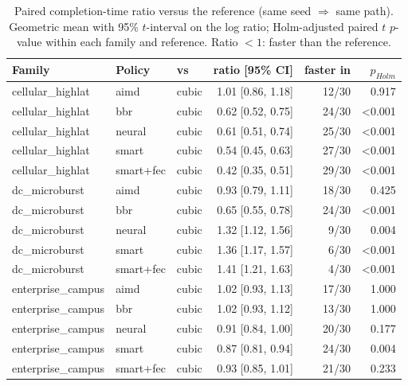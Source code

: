 \begin{table}[t]\centering\footnotesize
\caption{Paired completion-time ratio versus the reference (same seed $\Rightarrow$ same path). Geometric mean with 95\% $t$-interval on the log ratio; Holm-adjusted paired $t$ $p$-value within each family and reference. Ratio $<1$: faster than the reference.}
\label{tab:scalepaired}\begin{tabular}{lllrrr}\toprule
Family & Policy & vs & ratio [95\% CI] & faster in & $p_{Holm}$\\\midrule
cellular\_highlat & aimd & cubic & 1.01 [0.86, 1.18] & 12/30 & 0.917 \\
cellular\_highlat & bbr & cubic & 0.62 [0.52, 0.75] & 24/30 & <0.001 \\
cellular\_highlat & neural & cubic & 0.61 [0.51, 0.74] & 25/30 & <0.001 \\
cellular\_highlat & smart & cubic & 0.54 [0.45, 0.63] & 27/30 & <0.001 \\
cellular\_highlat & smart+fec & cubic & 0.42 [0.35, 0.51] & 29/30 & <0.001 \\
dc\_microburst & aimd & cubic & 0.93 [0.79, 1.11] & 18/30 & 0.425 \\
dc\_microburst & bbr & cubic & 0.65 [0.55, 0.78] & 24/30 & <0.001 \\
dc\_microburst & neural & cubic & 1.32 [1.12, 1.56] & 9/30 & 0.004 \\
dc\_microburst & smart & cubic & 1.36 [1.17, 1.57] & 6/30 & <0.001 \\
dc\_microburst & smart+fec & cubic & 1.41 [1.21, 1.63] & 4/30 & <0.001 \\
enterprise\_campus & aimd & cubic & 1.02 [0.93, 1.13] & 17/30 & 1.000 \\
enterprise\_campus & bbr & cubic & 1.02 [0.93, 1.12] & 13/30 & 1.000 \\
enterprise\_campus & neural & cubic & 0.91 [0.84, 1.00] & 20/30 & 0.177 \\
enterprise\_campus & smart & cubic & 0.87 [0.81, 0.94] & 24/30 & 0.004 \\
enterprise\_campus & smart+fec & cubic & 0.93 [0.85, 1.01] & 21/30 & 0.233 \\
\bottomrule\end{tabular}\end{table}
